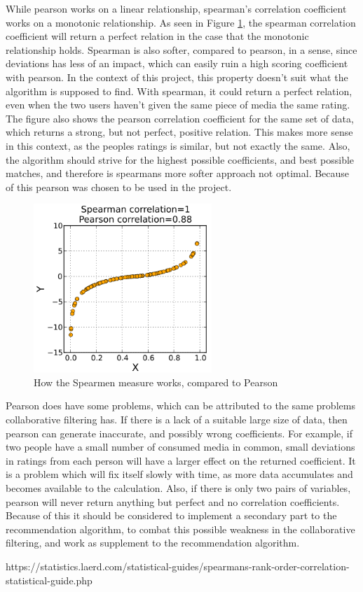 While pearson works on a linear relationship, spearman’s correlation coefficient works on a monotonic relationship. As seen in Figure \ref{Spearman}, the spearman correlation coefficient will return a perfect relation in the case that the monotonic relationship holds. Spearman is also softer, compared to pearson, in a sense, since deviations has less of an impact, which can easily ruin a high scoring coefficient with pearson. In the context of this project, this property doesn’t suit what the algorithm is supposed to find. With spearman, it could return a perfect relation, even when the two users haven’t given the same piece of media the same rating. The figure also shows the pearson correlation coefficient for the same set of data, which returns a strong, but not perfect, positive relation. This makes more sense in this context, as the peoples ratings is similar, but not exactly the same. Also, the algorithm should strive for the highest possible coefficients, and best possible matches, and therefore is spearmans more softer approach not optimal. Because of this pearson was chosen to be used in the project.

\begin{figure}[htb]
\centering
\includegraphics[width=0.6\textwidth]{Images/spearman.png}
\caption{How the Spearmen measure works, compared to Pearson}
\label{Spearman}
\end{figure}

Pearson does have some problems, which can be attributed to the same problems collaborative filtering has. If there is a lack of a suitable large size of data, then pearson can generate inaccurate, and possibly wrong coefficients. For example, if two people have a small number of consumed media in common, small deviations in ratings from each person will have a larger effect on the returned coefficient. It is a problem which will fix itself slowly with time, as more data accumulates and becomes available to the calculation. Also, if there is only two pairs of variables, pearson will never return anything but perfect and no correlation coefficients. Because of this it should be considered to implement a secondary part to the recommendation algorithm, to combat this possible weakness in the collaborative filtering, and work as supplement to the recommendation algorithm.

https://statistics.laerd.com/statistical-guides/spearmans-rank-order-correlation-statistical-guide.php